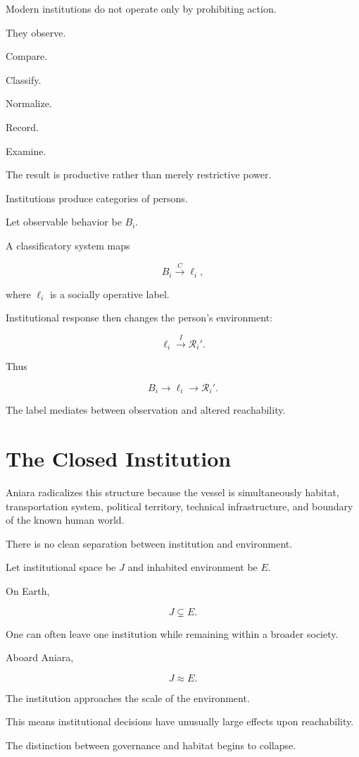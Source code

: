 \documentclass[11pt,oneside]{book}
\theoremstyle{definition}
\theoremstyle{remark}
\newcommand{\R}{\mathcal{R}}
\begin{document}
Modern institutions do not operate only by prohibiting action.

They observe.

Compare.

Classify.

Normalize.

Record.

Examine.

The result is productive rather than merely restrictive power.

Institutions produce categories of persons.

Let observable behavior be \(B_i\).

A classificatory system maps

\[
B_i
\xrightarrow{C}
\ell_i,
\]

where \(\ell_i\) is a socially operative label.

Institutional response then changes the person's environment:

\[
\ell_i
\xrightarrow{I}
\R_i'.
\]

Thus

\[
B_i
\rightarrow
\ell_i
\rightarrow
\R_i'.
\]

The label mediates between observation and altered reachability.

\section{The Closed Institution}

Aniara radicalizes this structure because the vessel is simultaneously habitat, transportation system, political territory, technical infrastructure, and boundary of the known human world.

There is no clean separation between institution and environment.

Let institutional space be \(J\) and inhabited environment be \(E\).

On Earth,

\[
J\subsetneq E.
\]

One can often leave one institution while remaining within a broader society.

Aboard Aniara,

\[
J\approx E.
\]

The institution approaches the scale of the environment.

This means institutional decisions have unusually large effects upon reachability.

The distinction between governance and habitat begins to collapse.
\end{document}
